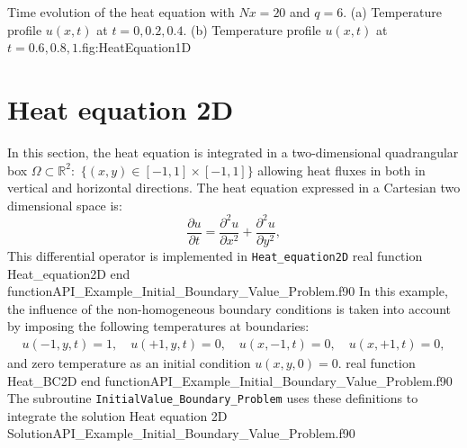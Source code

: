 \twographs
{}
{}
{Time evolution of the heat equation with $ Nx = 20$ and  $q=6$. (a) Temperature profile $u(x,t)$ at $t=0, 0.2, 0.4$. (b) Temperature profile $u(x,t)$ at $t=0.6, 0.8, 1$.}{fig:HeatEquation1D}
   
      
  
\newpage      
\section{Heat equation 2D}
\vspace{-0.1cm}
In this section, the heat equation is integrated in a two-dimensional quadrangular box   $\Omega \subset \mathbb{R}^2 : $ $\{(x,y)\in  [-1,1]\times[-1,1]\}$ allowing heat fluxes in both in vertical and horizontal directions. The heat equation expressed in a Cartesian two dimensional space is: 
\begin{equation*}
       \frac{\partial u}{\partial t} =     \frac{\partial^2 u}{\partial x^2} + \frac{\partial^2 u}{\partial y^2},
\end{equation*}
This differential operator is implemented in \verb|Heat_equation2D|
\vspace{0.2cm}
{real function Heat_equation2D}
{end function}{API_Example_Initial_Boundary_Value_Problem.f90}
In this example, the influence of the non-homogeneous boundary conditions is taken into account by imposing the following temperatures at boundaries: 
    \begin{align*}      	
        u(-1, y, t)=1, \quad u(+1, y, t)=0, \quad  u(x, -1, t)=0, \quad  u(x, +1, t)=0,
      \end{align*}
and zero temperature as an initial condition $ u(x,y,0) = 0$. 
\vspace{0.2cm}  
{real function Heat_BC2D}
{end function}{API_Example_Initial_Boundary_Value_Problem.f90}
The subroutine \verb|InitialValue_Boundary_Problem| uses these definitions to integrate the solution
\vspace{0.2cm} 
{Heat equation 2D}
{Solution}{API_Example_Initial_Boundary_Value_Problem.f90}
              
